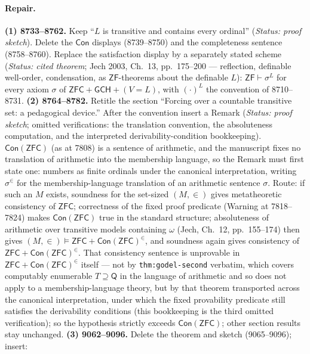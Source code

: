 \paragraph{Repair.}
\textbf{(1) 8733--8762.}  Keep ``\(L\) is transitive and contains every ordinal'' (\emph{Status: proof sketch}).  Delete the \(\mathsf{Con}\) displays (8739--8750) and the completeness sentence (8758--8760).  Replace the satisfaction display by a separately stated scheme (\emph{Status: cited theorem}; Jech 2003, Ch.~13, pp.~175--200 --- reflection, definable well-order, condensation, as \(\mathsf{ZF}\)-theorems about the definable \(L\)): \(\mathsf{ZF}\vdash\sigma^{L}\) for every axiom \(\sigma\) of \(\mathsf{ZFC}+\mathsf{GCH}+(V{=}L)\), with \((\cdot)^{L}\) the convention of 8710--8731.
\textbf{(2) 8764--8782.}  Retitle the section ``Forcing over a countable transitive set: a pedagogical device.''  After the convention insert a Remark (\emph{Status: proof sketch}; omitted verifications: the translation convention, the absoluteness computation, and the interpreted derivability-condition bookkeeping).  \(\mathsf{Con}(\mathsf{ZFC})\) (as at 7808) is a sentence of arithmetic, and the manuscript fixes no translation of arithmetic into the membership language, so the Remark must first state one: numbers as finite ordinals under the canonical interpretation, writing \(\sigma^{\in}\) for the membership-language translation of an arithmetic sentence \(\sigma\).  Route: if such an \(M\) exists, soundness for the set-sized \((M,\in)\) gives metatheoretic consistency of \(\mathsf{ZFC}\); correctness of the fixed proof predicate (Warning at 7818--7824) makes \(\mathsf{Con}(\mathsf{ZFC})\) true in the standard structure; absoluteness of arithmetic over transitive models containing \(\omega\) (Jech, Ch.~12, pp.~155--174) then gives \((M,\in)\models\mathsf{ZFC}+\mathsf{Con}(\mathsf{ZFC})^{\in}\), and soundness again gives consistency of \(\mathsf{ZFC}+\mathsf{Con}(\mathsf{ZFC})^{\in}\).  That consistency sentence is unprovable in \(\mathsf{ZFC}+\mathsf{Con}(\mathsf{ZFC})^{\in}\) itself --- not by \texttt{thm:godel-second} verbatim, which covers computably enumerable \(T\supseteq\mathsf Q\) in the language of arithmetic and so does not apply to a membership-language theory, but by that theorem transported across the canonical interpretation, under which the fixed provability predicate still satisfies the derivability conditions (this bookkeeping is the third omitted verification); so the hypothesis strictly exceeds \(\mathsf{Con}(\mathsf{ZFC})\); other section results stay unchanged.
\textbf{(3) 9062--9096.}  Delete the theorem and sketch (9065--9096); insert:
